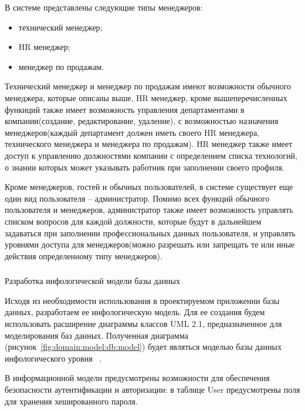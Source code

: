 В системе представлены следующие типы менеджеров:

\begin{itemize}
	\item технический менеджер;
	\item HR менеджер;
	\item менеджер по продажам.
\end{itemize}

Технический менеджер и менеджер по продажам имеют возможности обычного менеджера, которые описаны выше, HR менеджер,
кроме вышеперечисленных функиций также имеет возможность управления департаментами в компании(создание, редактирование,
удаление), с возможностью назначения менеджеров(каждый департамент должен иметь своего HR менеджера, технического
менеджера и менеджера по продажам). HR менеджер также имеет доступ к управлению должностями компании с определением
списка технологий, о знании которых может указывать работник при заполнении своего профиля.

Кроме менеджеров, гостей и обычных пользователей, в системе существует еще один вид пользователя -- администратор. 
Помимо всех функций обычного пользователя и менеджеров, администратор также имеет возможность управлять списком
вопросов для каждой должности, которые будут в дальнейшем задаваться при заполнении профессиональных данных пользователя,
и управлять уровнями доступа для менеджеров(можно разрешать или запрещать те или иные действия определенному типу
менеджеров).

\subsubsection{} Разработка инфологической модели базы данных
\label{sec:domain:model:database}

Исходя из необходимости использования в проектируемом приложении базы данных, разработаем ее инфологическую модель.
Для ее создания будем использовать расширение диаграммы классов UML 2.1, предназначенное для моделирования баз данных.
Полученная диаграмма (рисунок~\ref{fig:domain:model:db:model}) будет являться моделью базы данных инфологического
уровня ~\cite{kulikov_db_workbook}.

В информационной модели предусмотрены возможности для обеспечения безопасности аутентификации и авторизации: в
таблице User предусмотрены поля для хранения хешированного пароля.
